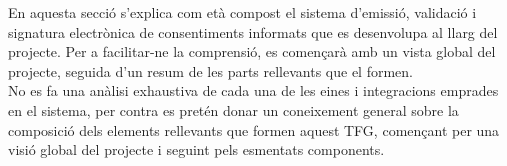 En aquesta secció s'explica com età compost el sistema d'emissió, validació i signatura electrònica de consentiments informats que es desenvolupa al llarg del projecte. Per a facilitar-ne la comprensió, es començarà amb un vista global del projecte, seguida d'un resum de les parts rellevants que el formen.\\
\newline No es fa una anàlisi exhaustiva de cada una de les eines i integracions emprades en el sistema, per contra es pretén donar un coneixement general sobre la composició dels elements rellevants que formen aquest TFG, començant per una visió global del projecte i seguint pels esmentats components.%

\clearpage

\clearpage

\clearpage

%
%
%
